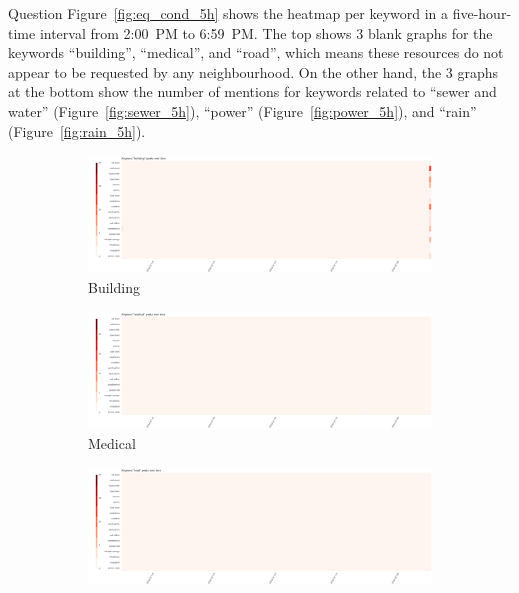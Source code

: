 \begin{section}{Question}
Figure~\ref{fig:eq_cond_5h} shows the heatmap per keyword in a five-hour-time 
interval from 2:00~PM to 6:59~PM. The top shows 3 blank graphs for the keywords
``building'', ``medical'', and ``road'', which means these resources do not 
appear to be requested by any neighbourhood. On the other hand, the 3 graphs at
the bottom show the number of mentions for keywords related to 
``sewer and water'' (Figure~\ref{fig:sewer_5h}), 
``power'' (Figure~\ref{fig:power_5h}), and ``rain'' (Figure~\ref{fig:rain_5h}). 

\begin{figure}[!h]
    \centering
    \begin{subfigure}[!h]{0.32\textwidth}
        \centering
        \includegraphics[width=1.00\textwidth]{figs/cond_5h/cond_5h_build.png}
        \caption{Building}
        \label{fig:build_5h}
    \end{subfigure}
    \begin{subfigure}[!h]{0.32\textwidth}
        \centering
        \includegraphics[width=1.00\textwidth]{figs/cond_5h/cond_5h_medical.png}
        \caption{Medical}
        \label{fig:medical_5h}
    \end{subfigure}
    \begin{subfigure}[!h]{0.32\textwidth}
        \centering
        \includegraphics[width=1.00\textwidth]{figs/cond_5h/cond_5h_road.png}

\end{subfigure}
\end{figure}
\end{section}

